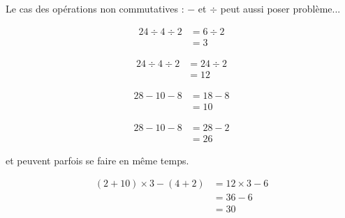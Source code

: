 \documentclass[11pt]{article}
\begin{document}
Le cas des opérations non commutatives : $-$ et $\div$ peut aussi poser problème... \\

\begin{center}
    \reversemarginpar\marginnote{$\Box \Box$}
\end{center}  \vspace{-1cm}

\begin{minipage}[t]{0.5\textwidth}

\begin{align*}
24 \div 4 \div 2 &= 6 \div 2 \\
                 &= 3
\end{align*}

\end{minipage}\begin{minipage}[t]{0.5\textwidth}

\begin{align*}
24 \div 4 \div 2 &= 24 \div 2 \\
                 &= 12
\end{align*}

\end{minipage}

\begin{minipage}[t]{0.5\textwidth}

\begin{align*}
28 -  10 - 8 &= 18 - 8 \\
             &= 10
\end{align*}

\end{minipage}\begin{minipage}[t]{0.5\textwidth}

\begin{align*}
28 -  10 - 8 &= 28 - 2  \\
             &= 26
\end{align*}

\end{minipage}

\begin{center}
\reversemarginpar\marginnote{$\Box \Box$}
     et peuvent parfois se faire en même temps.
\end{center}  \vspace{-1cm}

\begin{align*}
(2 +  10) \times 3 - (4 +2) &= 12 \times 3 - 6  \\
                            &= 36 - 6 \\
                            &= 30
\end{align*}
\end{document}
